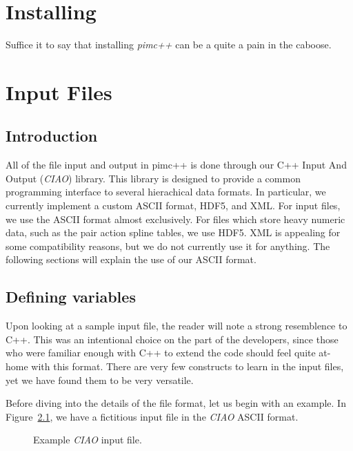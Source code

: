 \documentclass{book}
\begin{document}
\chapter{Installing}
Suffice it to say that installing {\em pimc++} can be a quite a pain
in the caboose.

\chapter{Input Files}
\section{Introduction}
All of the file input and output in pimc++ is done through our 
C++ Input And Output ({\em CIAO}) library.  This library is designed
to provide a common programming interface to several hierachical data
formats.  In particular, we currently implement a custom ASCII format,
HDF5, and XML.  For input files, we use the ASCII format almost
exclusively.  For files which store heavy numeric data, such as the
pair action spline tables, we use HDF5.  XML is appealing for some
compatibility reasons, but we do not currently use it for anything.
The following sections will explain the use of our ASCII format.  

\section{Defining variables}
Upon looking at a sample input file, the reader will note a strong
resemblence to C++.  This was an intentional choice on the part of the
developers, since those who were familiar enough with C++ to extend
the code should feel quite at-home with this format.  There are very
few constructs to learn in the input files, yet we have found them to
be very versatile.  

Before diving into the details of the file format, let us begin with
an example.  In Figure~\ref{fig:InputEx}, we have a fictitious input
file in the {\em CIAO} ASCII format.
\begin{figure}
\caption{Example {\em CIAO} input file.}
\label{fig:InputEx}
\end{figure}
\end{document}
